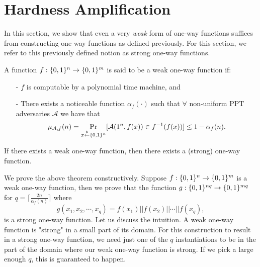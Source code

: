 \documentclass[12pt]{tufte-book}
\begin{document}
\section{Hardness Amplification}
\label{sec:owf:amplify}
In this section, we show that even a very \emph{weak} form of one-way functions suffices from constructing one-way functions as defined previously. For this section, we refer to this previously defined notion as strong one-way functions.
\begin{definition}
A function $f : \{0,1\}^{n} \rightarrow \{0,1\}^{m}$ is said to be a weak one-way function if:
\begin{itemize}
\item[-] $f$ is computable by a polynomial time machine, and
\item[-] There exists a noticeable function $\alpha_f(\cdot)$ such that $\forall$ non-uniform PPT adversaries $\mathcal{A}$ we have that
    $$
    \mu_{\mathcal{A},f}(n) =
    \Pr_{x \stackrel{\$}{\leftarrow} \{0,1\}^{n}}[ \mathcal{A}(1^n, f(x)) \in f^{-1}(f(x))] \leq 1 - \alpha_{f}(n).
    $$
\end{itemize}
\end{definition}

\begin{theorem}\label{theorem:weakstrongOWF}
If there exists a weak one-way function, then there exists a (strong) one-way function.
\end{theorem}

\proof We prove the above theorem constructively. Suppose $f : \{0,1\}^{n} \rightarrow \{0,1\}^{m}$ is a weak one-way function, then we prove that the function $g: \{0,1\}^{nq} \rightarrow \{0,1\}^{mq}$ for $q = \lceil \frac{2n}{\alpha_{f}(n)} \rceil$ where 
$$g(x_1, x_2, \cdots, x_q) = f(x_1) || f(x_2) || \cdots || f(x_q),$$
 is a strong one-way function. Let us discuss the intuition. A weak one-way function is "strong" in a small part of its domain. For this construction to result in a strong one-way function, we need just one of the $q$ instantiations to be in the part of the domain where our weak one-way function is strong. If we pick a large enough $q$, this is guaranteed to happen.
\end{document}
